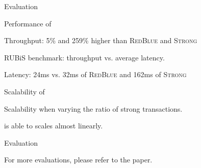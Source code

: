 
\begin{frame}{}
  \begin{center}
    {\Large Evaluation}
  \end{center}
\end{frame}

\begin{frame}{Performance of \unistore}
  \begin{center}
    Throughput: 5\% and 259\% higher than \textsc{RedBlue} and \textsc{Strong}

    \vspace{-0.20cm}
    {\small RUBiS benchmark: throughput vs. average latency.}

    \vspace{0.50cm}
    Latency: 24ms vs. 32ms of \textsc{RedBlue} and 162ms of \textsc{Strong}
  \end{center}
\end{frame}

\begin{frame}{Scalability of \unistore}
  \begin{center}
    {\small Scalability when varying the ratio of strong transactions.}

    \vspace{0.50cm}
    \unistore{} is able to scales almost linearly.
  \end{center}
\end{frame}

\begin{frame}{Evaluation}
  \begin{center}
    For more evaluations, please refer to the paper.
  \end{center}
\end{frame}
